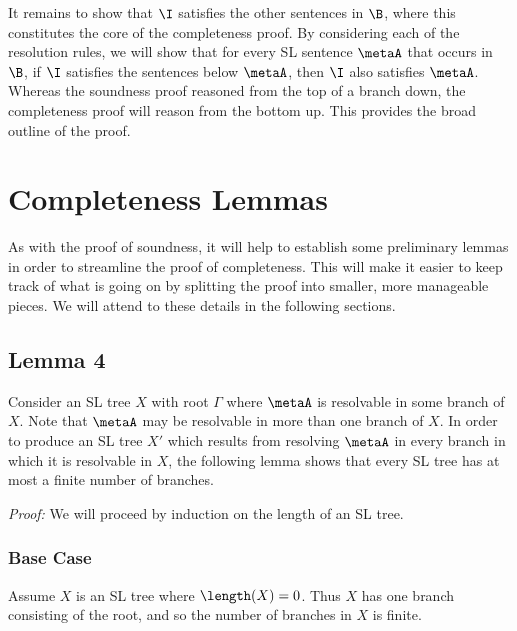 It remains to show that $\I$ satisfies the other sentences in $\B$, where this constitutes the core of the completeness proof.
By considering each of the resolution rules, we will show that for every SL sentence $\metaA$ that occurs in $\B$, if $\I$ satisfies the sentences below $\metaA$, then $\I$ also satisfies $\metaA$. 
Whereas the soundness proof reasoned from the top of a branch down, the completeness proof will reason from the bottom up.
This provides the broad outline of the proof.





\section{Completeness Lemmas}

As with the proof of soundness, it will help to establish some preliminary lemmas in order to streamline the proof of completeness.
This will make it easier to keep track of what is going on by splitting the proof into smaller, more manageable pieces.
We will attend to these details in the following sections.





\subsection{Lemma 4}

Consider an SL tree $X$ with root $\Gamma$ where $\metaA$ is resolvable in some branch of $X$. 
Note that $\metaA$ may be resolvable in more than one branch of $X$. 
In order to produce an SL tree $X'$ which results from resolving $\metaA$ in every branch in which it is resolvable in $X$, the following lemma shows that every SL tree has at most a finite number of branches.

\label{FiniteBranchLemma}

\textit{Proof:}
We will proceed by induction on the length of an SL tree.

\subsubsection{Base Case}

Assume $X$ is an SL tree where $\length(X)=0$. 
Thus $X$ has one branch consisting of the root, and so the number of branches in $X$ is finite. 




